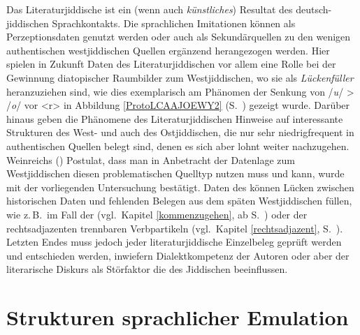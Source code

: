 Das Literaturjiddische ist ein (wenn auch \textit{künstliches}) Resultat des deutsch-jid\-di\-schen Sprach\-kontakts. Die sprachlichen Imitationen können als Perzeptionsdaten genutzt werden oder auch als Sekundärquellen zu den wenigen authentischen westjiddischen Quellen ergänzend herangezogen werden. Hier spielen in Zukunft Daten des Literaturjiddischen vor allem eine Rolle bei der Gewinnung diatopischer  Raumbilder zum Westjiddischen, wo sie als \textit{Lückenfüller} heranzuziehen sind, wie dies exemplarisch am Phänomen der Senkung von /\textit{u}/ > /\textit{o}/ vor <r> in Abbildung \ref{ProtoLCAAJOEWY2} (S.\, \pageref{ProtoLCAAJOEWY2}) gezeigt wurde. Darüber hinaus geben die Phänomene des Literaturjiddischen Hinweise auf interessante Strukturen des West- und auch des Ostjiddischen, die nur sehr niedrigfrequent in authentischen Quellen belegt sind, denen es sich aber lohnt weiter nachzugehen. Weinreichs (\citeyear[62]{Weinreich1953}) Postulat, dass man in Anbetracht der Datenlage zum Westjiddischen diesen problematischen Quelltyp nutzen muss und kann, wurde mit der vorliegenden Untersuchung bestätigt. Daten des  können Lücken zwischen historischen Daten und fehlenden Belegen aus dem späten Westjiddischen füllen, wie z.\,B.\, im Fall der  (vgl.\, Kapitel \ref{kommenzugehen}, ab S.\, \pageref{kommenzugehen}) oder der rechtsadjazenten trennbaren Verbpartikeln (vgl.\, Kapitel \ref{rechtsadjazent}, S.\, \pageref{rechtsadjazent}). Letzten Endes muss jedoch jeder literaturjiddische Einzelbeleg geprüft werden und entschieden werden, inwiefern Dialektkompetenz der Autoren oder aber der literarische Diskurs als Störfaktor die  des Jiddischen beeinflussen.
 
 \chapter{Strukturen sprachlicher Emulation}\label{lernenimitation}
 


